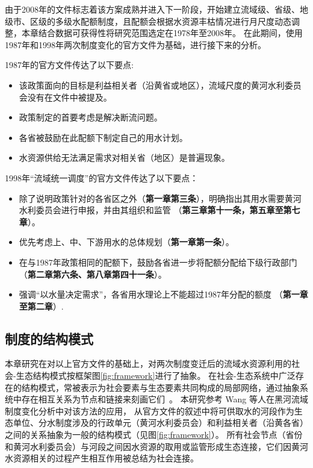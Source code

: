 由于2008年的文件标志着该方案成熟并进入下一阶段，开始建立流域级、省级、地级市、区级的多级水配额制度，且配额会根据水资源丰枯情况进行月尺度动态调整，本章结合数据可获得性将研究范围选定在1978年至2008年。
在此期间，使用1987年和1998年两次制度变化的官方文件为基础，进行接下来的分析。

1987年的官方文件传达了以下要点:

\begin{itemize}
	\item 该政策面向的目标是利益相关者（沿黄省或地区），流域尺度的黄河水利委员会没有在文件中被提及。
	\item 政策制定的首要考虑是解决断流问题。
	\item 各省被鼓励在此配额下制定自己的用水计划。
	\item 水资源供给无法满足需求对相关省（地区）是普遍现象。
\end{itemize}

1998年“流域统一调度”的官方文件传达了以下要点：

\begin{itemize}
	\item 除了说明政策针对的各省区之外（\textbf{第一章第三条}），明确指出其用水需要黄河水利委员会进行申报，并由其组织和监管 （\textbf{第三章第十一条，第五章至第七章}）。
	\item 优先考虑上、中、下游用水的总体规划（\textbf{第一章第一条}）。
	\item 在与1987年政策相同的配额下，鼓励各省进一步将配额分配给下级行政部门（\textbf{第二章第六条、第八章第四十一条}）。
	\item 强调“以水量决定需求”，各省用水理论上不能超过1987年分配的额度 （\textbf{第一章至第二章}）.
\end{itemize}

\subsection{制度的结构模式}\label{sec:structures}

本章研究在对以上官方文件的基础上，对两次制度变迁后的流域水资源利用的社会-生态结构模式按框架图\ref{fig:framework}进行了抽象。
在社会-生态系统中广泛存在的结构模式，常被表示为社会要素与生态要素共同构成的局部网络，通过抽象系统中存在相互关系为节点和链接来刻画它们~\cite{bodin2017a,kluger2020,guerrero2015}。
本研究参考 Wang 等人在黑河流域制度变化分析中对该方法的应用\cite{wang2019d}，
从官方文件的叙述中将可供取水的河段作为生态单位、分水制度涉及的行政单元（黄河水利委员会）和利益相关者（沿黄各省）之间的关系抽象为一般的结构模式（见图\ref{fig:framework}）。
所有社会节点（省份和黄河水利委员会）与河段之间因水资源的取用或监管形成生态连接，它们因黄河水资源相关的过程产生相互作用被总结为社会连接。

